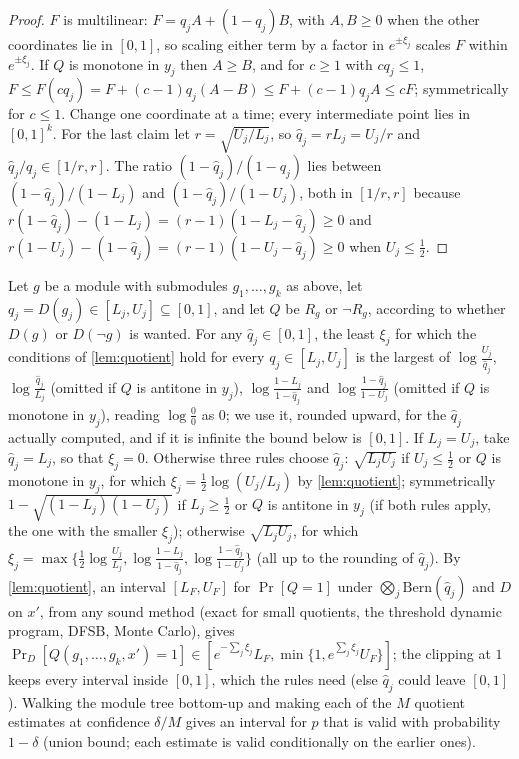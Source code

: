 \begin{proof}
$F$ is multilinear: $F=q_jA+(1-q_j)B$, with $A,B\ge0$ when the other coordinates
lie in $[0,1]$, so scaling either term by a factor in $e^{\pm\xi_j}$ scales $F$ within
$e^{\pm\xi_j}$. If $Q$ is monotone in $y_j$ then $A\ge B$, and for $c\ge1$ with
$cq_j\le1$, $F\le F(cq_j)=F+(c-1)q_j(A-B)\le F+(c-1)q_jA\le cF$; symmetrically for
$c\le1$. Change one coordinate at a time; every intermediate point lies in
$[0,1]^k$. For the last claim let $r=\sqrt{U_j/L_j}$, so $\hat q_j=rL_j=U_j/r$ and
$\hat q_j/q_j\in[1/r,r]$. The ratio $(1-\hat q_j)/(1-q_j)$ lies between
$(1-\hat q_j)/(1-L_j)$ and $(1-\hat q_j)/(1-U_j)$, both in $[1/r,r]$ because
$r(1-\hat q_j)-(1-L_j)=(r-1)(1-L_j-\hat q_j)\ge0$ and
$r(1-U_j)-(1-\hat q_j)=(r-1)(1-U_j-\hat q_j)\ge0$ when $U_j\le\frac12$.
\end{proof}

Let $g$ be a module with submodules $g_1,\dots,g_k$ as above, let
$q_j=D(g_j)\in[L_j,U_j]\subseteq[0,1]$, and let $Q$ be $R_g$ or $\neg R_g$, according to
whether $D(g)$ or $D(\neg g)$ is wanted. For any $\hat q_j\in[0,1]$, the least $\xi_j$
for which the conditions of \cref{lem:quotient} hold for every $q_j\in[L_j,U_j]$ is the
largest of $\log\frac{U_j}{\hat q_j}$, $\log\frac{\hat q_j}{L_j}$ (omitted if $Q$ is
antitone in $y_j$), $\log\frac{1-L_j}{1-\hat q_j}$ and $\log\frac{1-\hat q_j}{1-U_j}$
(omitted if $Q$ is monotone in $y_j$), reading $\log\frac00$ as $0$; we use it,
rounded upward, for the $\hat q_j$ actually computed, and if it is infinite the bound
below is $[0,1]$. If $L_j=U_j$, take $\hat q_j=L_j$, so that $\xi_j=0$. Otherwise three
rules choose $\hat q_j$: $\sqrt{L_jU_j}$ if $U_j\le\frac12$ or $Q$ is monotone in
$y_j$, for which $\xi_j=\frac12\log(U_j/L_j)$ by \cref{lem:quotient}; symmetrically
$1-\sqrt{(1-L_j)(1-U_j)}$ if $L_j\ge\frac12$ or $Q$ is antitone in $y_j$ (if both rules
apply, the one with the smaller $\xi_j$); otherwise $\sqrt{L_jU_j}$, for which
$\xi_j=\max\{\frac12\log\frac{U_j}{L_j},\log\frac{1-L_j}{1-\hat q_j},\log\frac{1-\hat
q_j}{1-U_j}\}$ (all up to the rounding of $\hat q_j$). By \cref{lem:quotient}, an interval
$[L_F,U_F]$ for $\Pr[Q=1]$ under $\bigotimes_j\mathrm{Bern}(\hat q_j)$ and $D$ on $x'$,
from any sound method (exact for small quotients, the threshold dynamic program, DFSB,
Monte Carlo), gives
$\Pr_D[Q(g_1,\dots,g_k,x')=1]\in[e^{-\sum_j\xi_j}L_F,\min\{1,e^{\sum_j\xi_j}U_F\}]$; the
clipping at $1$ keeps every interval inside $[0,1]$, which the rules need (else
$\hat q_j$ could leave $[0,1]$). Walking the module tree bottom-up and making each of the
$M$ quotient estimates at confidence $\delta/M$ gives an interval for $p$ that is
valid with probability $1-\delta$ (union bound; each estimate is valid conditionally
on the earlier ones).

